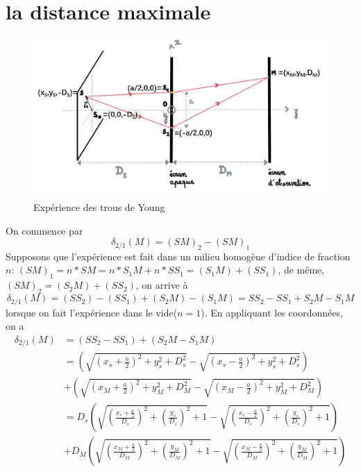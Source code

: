 \documentclass[a4paper,12pt]{book}
\begin{document}
\renewcommand{\labelitemi}{$\blacktriangleright$}
\renewcommand{\labelitemii}{$\bullet$}


\section{la distance maximale}
\begin{figure}[h]
    \begin{center}
    \includegraphics[scale=0.7]{tr5.png}
    \end{center}
    \caption{Expérience des trous de Young}
\end{figure}
On commence par $$\delta_{2/1}(M)=(SM)_2-(SM)_1$$
Supposons que l'expérience est fait dans un milieu homogène d'indice de fraction $n$: 
$(SM)_1=n*SM=n*S_1M+n*SS_1=(S_1M)+(SS_1)$, de même, $(SM)_2=(S_2M)+(SS_2)$, on arrive à 
$$\delta_{2/1}(M)=(SS_2)-(SS_1) + (S_2M)-(S_1M)=SS_2-SS_1 + S_2M-S_1M $$
lorsque on fait l’expérience dans le vide($n=1$). En appliquant les coordonnées, on a 
\begin{align*}
    \delta_{2/1}(M)&=(SS_2-SS_1) + (S_2M-S_1M)\\
                   &=\left(\sqrt{\left(x_s+\frac{a}{2}\right)^2+y_s^2+D_s^2}-
                     \sqrt{\left(x_s-\frac{a}{2}\right)^2+y_s^2+D_s^2}\right)\\
                   &+
                     \left(\sqrt{\left(x_M+\frac{a}{2}\right)^2+y_M^2+D_M^2}-
                     \sqrt{\left(x_M-\frac{a}{2}\right)^2+y_M^2+D_M^2}\right)\\
                   &=D_s\left(\sqrt{\left(\frac{x_s+\frac{a}{2}}{D_s}\right)^2+\left(\frac{y_s}{D_s}\right)^2+1}
                   -\sqrt{\left(\frac{x_s-\frac{a}{2}}{D_s}\right)^2+\left(\frac{y_s}{D_s}\right)^2+1}\right)\\
                   &+D_M\left(\sqrt{\left(\frac{x_M+\frac{a}{2}}{D_M}\right)^2+\left(\frac{y_M}{D_M}\right)^2+1}
                   -\sqrt{\left(\frac{x_M-\frac{a}{2}}{D_M}\right)^2+\left(\frac{y_M}{D_M}\right)^2+1}\right)
\end{align*}
\end{document}
